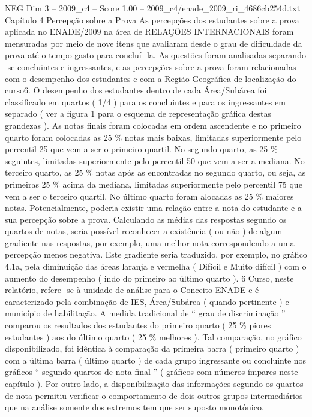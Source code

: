 \begin{textsample}{NEG Dim 3 – 2009\_c4 – Score 1.00 – 2009\_c4/enade\_2009\_ri\_4686cb254d.txt}  \label{ex:f3_neg_163}
Capítulo 4 Percepção sobre a Prova As percepções dos estudantes sobre a prova aplicada no ENADE/2009 na área de RELAÇÕES INTERNACIONAIS foram mensuradas por meio de nove itens que avaliaram desde o grau de dificuldade da prova até o tempo gasto para concluí -la.
As questões foram analisadas separando -se concluintes e ingressantes, e as percepções sobre a prova foram relacionadas com o desempenho dos estudantes e com a Região Geográfica de localização do curso6.
O desempenho dos estudantes dentro de cada Área/Subárea foi classificado em quartos ( 1/4 ) para os concluintes e para os ingressantes em separado ( ver a figura 1 para o esquema de representação gráfica destas grandezas ).
As notas finais foram colocadas em ordem ascendente e no primeiro quarto foram colocadas as 25 \% notas mais baixas, limitadas superiormente pelo percentil 25 que vem a ser o primeiro quartil.
No segundo quarto, as 25 \% seguintes, limitadas superiormente pelo percentil 50 que vem a ser a mediana.
No terceiro quarto, as 25 \% notas após as encontradas no segundo quarto, ou seja, as primeiras 25 \% acima da mediana, limitadas superiormente pelo percentil 75 que vem a ser o terceiro quartil.
No último quarto foram alocadas as 25 \% maiores notas.
Potencialmente, poderia existir uma relação entre a nota do estudante e a sua percepção sobre a prova.
Calculando as médias das respostas segundo os quartos de notas, seria possível reconhecer a existência ( ou não ) de algum gradiente nas respostas, por exemplo, uma melhor nota correspondendo a uma percepção menos negativa.
Este gradiente seria traduzido, por exemplo, no gráfico 4.1a, pela diminuição das áreas laranja e vermelha ( Difícil e Muito difícil ) com o aumento do desempenho ( indo do primeiro ao último quarto ). 6 Curso, neste relatório, refere -se à unidade de análise para o Conceito ENADE e é caracterizado pela combinação de IES, Área/Subárea ( quando pertinente ) e município de habilitação.
A medida tradicional de “ grau de discriminação ” comparou os resultados dos estudantes do primeiro quarto ( 25 \% piores estudantes ) aos do último quarto ( 25 \% melhores ).
Tal comparação, no gráfico disponibilizado, foi idêntica à comparação da primeira barra ( primeiro quarto ) com a última barra ( último quarto ) de cada grupo ingressante ou concluinte nos gráficos “ segundo quartos de nota final ” ( gráficos com números ímpares neste capítulo ).
Por outro lado, a disponibilização das informações segundo os quartos de nota permitiu verificar o comportamento de dois outros grupos intermediários que na análise somente dos extremos tem que ser suposto monotônico.

\end{textsample}
